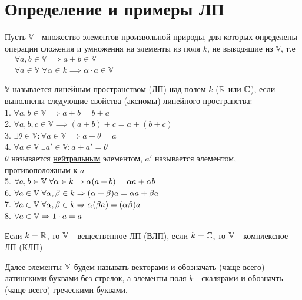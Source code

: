 \documentclass[../main.tex]{subfiles}
\begin{document}
\section{Определение и примеры ЛП}
Пусть $\mathbb{V} $ - множество элементов произвольной природы, для которых определены операции сложения и умножения на элементы из поля $k$, не выводящие из $\mathbb{V}$, т.е $\begin{aligned} &\forall a,b\in \mathbb{V}\implies a+b\in \mathbb{V}\\ &\forall a \in \mathbb{V} \;\forall \alpha \in k \implies \alpha \cdot a \in \mathbb{V} \end{aligned}$
\begin{definition}
    $\mathbb{V}$ называется линейным пространством (ЛП) над полем $k$ ($\mathbb{R}$ или $\mathbb{C}$), если выполнены следующие свойства (аксиомы) линейного пространства:
    \\1. $\forall a,b \in \mathbb{V}\implies a+b = b+ a $
    \\2. $\forall a,b,c \in \mathbb{V}\implies (a+b)+c = a+(b+c)$
    \\3. $\exists \theta \in \mathbb{V}: \forall a \in \mathbb{V} \implies a+\theta = a$ 
    \\4. $\forall a \in \mathbb{V} \;\exists a' \in \mathbb{V}: a+a' = \theta$
    \\$\theta$ называется \underline{нейтральным} элементом, $a'$ называется элементом, \underline{противоположным} к $a$
    \\5. $\forall a,b \in \mathbb{V} \;\forall \alpha \in k \Rightarrow \alpha (a+b)=\alpha a + \alpha b$
    \\6. $\forall a \in \mathbb{V} \;\forall \alpha, \beta \in k \Rightarrow (\alpha + \beta)a = \alpha a + \beta a$
    \\7. $\forall a \in \mathbb{V} \;\forall \alpha, \beta \in k \Rightarrow \alpha(\beta a) = (\alpha \beta) a$
    \\8. $\forall a \in \mathbb{V} \Rightarrow 1\cdot a = a$
\end{definition}
Если $k=\mathbb{R}$, то $\mathbb{V}$ - вещественное ЛП (ВЛП), если $k=\mathbb{C}$, то $\mathbb{V}$ - комплексное ЛП (КЛП)

Далее элементы $\mathbb{V}$ будем называть \underline{векторами} и обозначать (чаще всего) латинскими буквами без стрелок, а элементы поля $k$ - \underline{скалярами} и обозначть (чаще всего) греческими буквами. 
\end{document}
